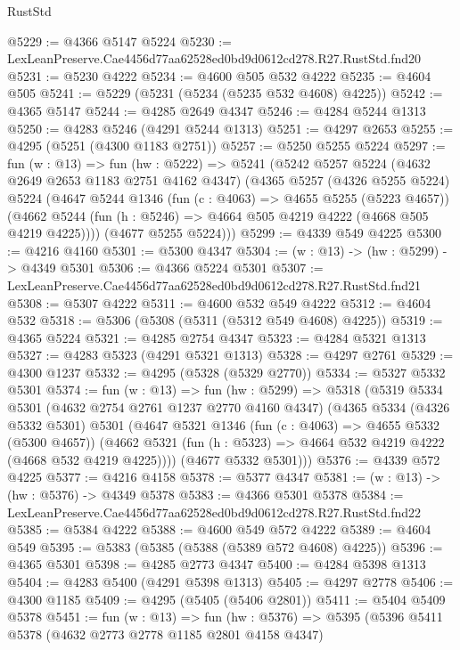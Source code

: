 \begin{lexlean}{RustStd}
\begin{coremodule}
@5229 := @4366 @5147 @5224
@5230 := LexLeanPreserve.Cae4456d77aa62528ed0bd9d0612cd278.R27.RustStd.fnd20
@5231 := @5230 @4222
@5234 := @4600 @505 @532 @4222
@5235 := @4604 @505
@5241 := @5229 (@5231 (@5234 (@5235 @532 @4608) @4225))
@5242 := @4365 @5147
@5244 := @4285 @2649 @4347
@5246 := @4284 @5244 @1313
@5250 := @4283 @5246 (@4291 @5244 @1313)
@5251 := @4297 @2653
@5255 := @4295 (@5251 (@4300 @1183 @2751))
@5257 := @5250 @5255 @5224
@5297 := fun (w : @13) =>
  fun (hw : @5222) =>
  @5241
    (@5242
      @5257
      @5224
      (@4632 @2649 @2653 @1183 @2751 @4162 @4347)
      (@4365
        @5257
        (@4326 @5255 @5224)
        @5224
        (@4647
          @5244
          @1346
          (fun (c : @4063) => @4655 @5255 (@5223 @4657))
          (@4662 @5244 (fun (h : @5246) => @4664 @505 @4219 @4222 (@4668 @505 @4219 @4225))))
        (@4677 @5255 @5224)))
@5299 := @4339 @549 @4225
@5300 := @4216 @4160
@5301 := @5300 @4347
@5304 := (w : @13) -> (hw : @5299) -> @4349 @5301
@5306 := @4366 @5224 @5301
@5307 := LexLeanPreserve.Cae4456d77aa62528ed0bd9d0612cd278.R27.RustStd.fnd21
@5308 := @5307 @4222
@5311 := @4600 @532 @549 @4222
@5312 := @4604 @532
@5318 := @5306 (@5308 (@5311 (@5312 @549 @4608) @4225))
@5319 := @4365 @5224
@5321 := @4285 @2754 @4347
@5323 := @4284 @5321 @1313
@5327 := @4283 @5323 (@4291 @5321 @1313)
@5328 := @4297 @2761
@5329 := @4300 @1237
@5332 := @4295 (@5328 (@5329 @2770))
@5334 := @5327 @5332 @5301
@5374 := fun (w : @13) =>
  fun (hw : @5299) =>
  @5318
    (@5319
      @5334
      @5301
      (@4632 @2754 @2761 @1237 @2770 @4160 @4347)
      (@4365
        @5334
        (@4326 @5332 @5301)
        @5301
        (@4647
          @5321
          @1346
          (fun (c : @4063) => @4655 @5332 (@5300 @4657))
          (@4662 @5321 (fun (h : @5323) => @4664 @532 @4219 @4222 (@4668 @532 @4219 @4225))))
        (@4677 @5332 @5301)))
@5376 := @4339 @572 @4225
@5377 := @4216 @4158
@5378 := @5377 @4347
@5381 := (w : @13) -> (hw : @5376) -> @4349 @5378
@5383 := @4366 @5301 @5378
@5384 := LexLeanPreserve.Cae4456d77aa62528ed0bd9d0612cd278.R27.RustStd.fnd22
@5385 := @5384 @4222
@5388 := @4600 @549 @572 @4222
@5389 := @4604 @549
@5395 := @5383 (@5385 (@5388 (@5389 @572 @4608) @4225))
@5396 := @4365 @5301
@5398 := @4285 @2773 @4347
@5400 := @4284 @5398 @1313
@5404 := @4283 @5400 (@4291 @5398 @1313)
@5405 := @4297 @2778
@5406 := @4300 @1185
@5409 := @4295 (@5405 (@5406 @2801))
@5411 := @5404 @5409 @5378
@5451 := fun (w : @13) =>
  fun (hw : @5376) =>
  @5395
    (@5396
      @5411
      @5378
      (@4632 @2773 @2778 @1185 @2801 @4158 @4347)

\end{coremodule}
\end{lexlean}
